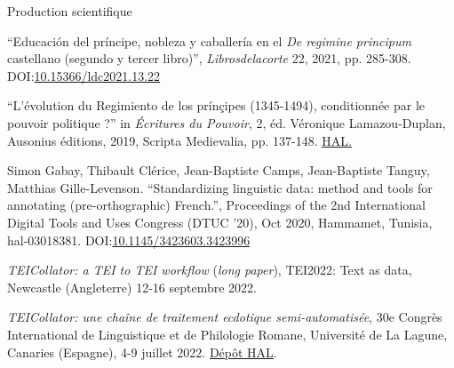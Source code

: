 \begin{rubric}{Production scientifique}
                   
                
                    
                    \entry*
                
                        \enquote{Educación del príncipe, nobleza y caballería en el \textit{De regimine principum} castellano (segundo y tercer
                            libro)}, \textit{Librosdelacorte} 22, 2021, pp.
                        285-308. DOI:\href{https://doi.org/10.15366/ldc2021.13.22.010}{10.15366/ldc2021.13.22}
                    
                    
                    \entry*
                
                        \enquote{L'évolution du Regimiento de los prínçipes (1345-1494),
                            conditionnée par le pouvoir politique ?} in \textit{Écritures du Pouvoir}, 2, éd. Véronique Lamazou-Duplan, Ausonius
                        éditions, 2019, Scripta Medievalia, pp. 137-148. \href{https://hal.archives-ouvertes.fr/hal-02369116}{HAL.}
                    
                \vspace{1cm}
            
                    
                    \entry*
                Simon Gabay, Thibault Clérice, Jean-Baptiste Camps, Jean-Baptiste Tanguy,
                        Matthias Gille-Levenson. \enquote{Standardizing linguistic data: method and
                                tools for annotating (pre-orthographic) French.}, Proceedings
                        of the 2nd International Digital Tools and Uses Congress (DTUC '20), Oct 2020,
                        Hammamet, Tunisia, hal-03018381. DOI:\href{https://dx.doi.org/10.1145/3423603.3423996}{10.1145/3423603.3423996}
                \vspace{1cm}
            
                    
                    \entry*
                \textit{\textit{TEICollator: a TEI to TEI workflow}} (\textit{long
                            paper}), TEI2022: Text as data, Newcastle (Angleterre) 12-16 septembre
                        2022.
                    
                    \entry*
                \textit{TEICollator: une chaîne de traitement ecdotique
                            semi-automatisée}, 30e Congrès International de Linguistique et de
                        Philologie Romane, Université de La Lagune, Canaries (Espagne), 4-9 juillet 2022.
                            \href{https://hal.archives-ouvertes.fr/hal-03715059}{Dépôt
                        HAL}.
                    

\end{rubric}
